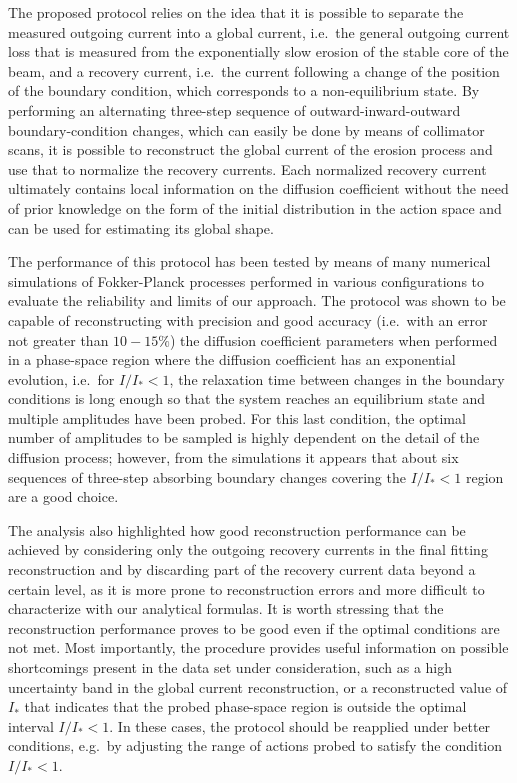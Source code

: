 The proposed protocol relies on the idea that it is possible to separate the measured outgoing current into a global current, i.e.\ the general outgoing current loss that is measured from the exponentially slow erosion of the stable core of the beam, and a recovery current, i.e.\ the current following a change of the position of the boundary condition, which corresponds to a non-equilibrium state. By performing an alternating three-step sequence of outward-inward-outward boundary-condition changes, which can easily be done by means of collimator scans, it is possible to reconstruct the global current of the erosion process and use that to normalize the recovery currents. Each normalized recovery current ultimately contains local information on the diffusion coefficient without the need of prior knowledge on the form of the initial distribution in the action space and can be used for estimating its global shape.

The performance of this protocol has been tested by means of many numerical simulations of Fokker-Planck processes performed in various configurations to evaluate the reliability and limits of our approach. The protocol was shown to be capable of reconstructing with precision and good accuracy {(i.e.\ with an error not greater than $10-15\%$)} the diffusion coefficient parameters when performed in a phase-space region where the diffusion coefficient has an exponential evolution, i.e.\ for $I/I_\ast < 1$, the relaxation time between changes in the boundary conditions is long enough so that the system reaches an equilibrium state and multiple amplitudes have been probed. For this last condition, the optimal number of amplitudes to be sampled is highly dependent on the detail of the diffusion process; however, from the simulations it appears that about six sequences of three-step absorbing boundary changes covering the $I / I_\ast < 1$ region are a good choice. 

The analysis also highlighted how good reconstruction performance can be achieved by considering only the outgoing recovery currents in the final fitting reconstruction and by discarding part of the recovery current data beyond a certain level, as it is more prone to reconstruction errors and more difficult to characterize with our analytical formulas. It is worth stressing that the reconstruction performance proves to be good even if the optimal conditions are not met. Most importantly, the procedure provides useful information on possible shortcomings present in the data set under consideration, such as a high uncertainty band in the global current reconstruction, or a reconstructed value of $I_\ast$ that indicates that the probed phase-space region is outside the optimal interval $I / I_\ast < 1$. In these cases, the protocol should be reapplied under better conditions, e.g.\ by adjusting the range of actions probed to satisfy the condition $I / I_\ast < 1$.

